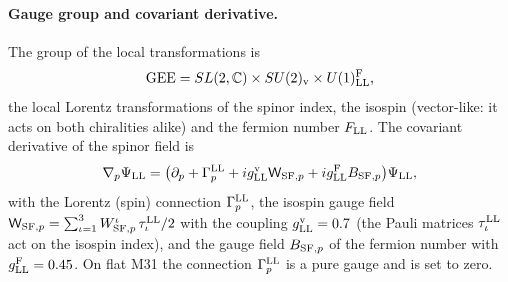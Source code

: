 \documentclass[aps,prd,twocolumn,superscriptaddress,nofootinbib,floatfix,longbibliography]{revtex4-2}
\newcommand{\LL}{{\rm LL}}
\newcommand{\SF}{{\rm SF}}
\begin{document}
\paragraph*{Gauge group and covariant derivative.}
The group of the local transformations is
\begin{equation}
\mathrm{GEE}=SL(2,\mathbb C)\times SU(2)_{\rm v}\times U(1)^{\rm F}_\LL ,
\label{eq:GEE}
\end{equation}
the local Lorentz transformations of the spinor index, the isospin (vector-like: it acts on both chiralities alike) and
the fermion number $F_\LL$. The covariant derivative of the spinor field is
\begin{equation}
\nabla_p\Psi_\LL=\big(\partial_p+\Gamma^\LL_p+ig^{\rm v}_\LL\mathsf W_{\SF,p}+ig^{\rm F}_\LL B_{\SF,p}\big)\Psi_\LL ,
\label{eq:cov}
\end{equation}
with the Lorentz (spin) connection $\Gamma^\LL_p$, the isospin gauge field
$\mathsf W_{\SF,p}=\sum_{\iota=1}^3W^\iota_{\SF,p}\,\tau^\LL_\iota/2$ with the coupling
$g^{\rm v}_\LL=0.7$ (the Pauli matrices $\tau^\LL_\iota$ act on the isospin index), and the gauge field $B_{\SF,p}$ of the
fermion number with $g^{\rm F}_\LL=0.45$. On flat M31 the connection $\Gamma^\LL_p$ is a pure gauge and is set to zero.
\end{document}

